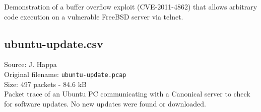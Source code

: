 \documentclass[12pt,a4paper]{article}
\begin{document}
            Demonstration of a buffer overflow exploit (CVE-2011-4862)
            that allows arbitrary code execution on a vulnerable
            FreeBSD server via telnet.

        \subsection{ubuntu-update.csv}
            Source: J. Happa\\
            Original filename: \verb|ubuntu-update.pcap|\\
            Size: 497 packets - 84.6 kB\\

            Packet trace of an Ubuntu PC communicating with a Canonical
            server to check for software updates. No new updates were
            found or downloaded.
\end{document}
